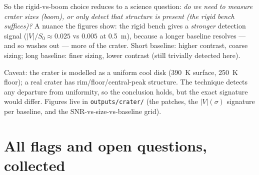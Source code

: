 \documentclass[11pt]{article}
\newcommand{\code}[1]{\texttt{\small #1}}
\begin{document}
So the rigid-vs-boom choice reduces to a science question: \emph{do we need to
measure crater sizes (boom), or only detect that structure is present (the
rigid bench suffices)?} A nuance the figures show: the rigid bench gives a
\emph{stronger} detection signal ($|V|/S_0\approx0.025$ vs $0.005$ at
\SI{0.5}{\metre}), because a longer baseline resolves --- and so washes out
--- more of the crater. Short baseline: higher contrast, coarse sizing; long
baseline: finer sizing, lower contrast (still trivially detected here).

Caveat: the crater is modelled as a uniform cool disk (\SI{390}{\kelvin}
surface, \SI{250}{\kelvin} floor); a real crater has rim/floor/central-peak
structure. The technique detects any departure from uniformity, so the
conclusion holds, but the exact signature would differ. Figures live in
\code{outputs/crater/} (the patches, the $|V|(\sigma)$ signature per baseline,
and the SNR-vs-size-vs-baseline grid).

\section{All flags and open questions, collected}
\end{document}
